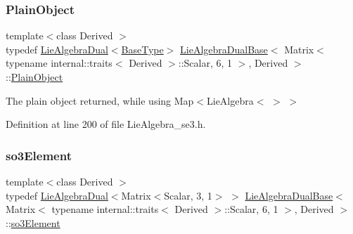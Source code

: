 \subsubsection{\texorpdfstring{Plain\+Object}{PlainObject}}
{\footnotesize\ttfamily template$<$class Derived $>$ \\
typedef \hyperlink{class_lie_algebra_dual}{Lie\+Algebra\+Dual}$<$\hyperlink{class_lie_algebra_dual_base_3_01_matrix_3_01typename_01internal_1_1traits_3_01_derived_01_4_1_1_7557dc73cbfcbc32e399b9855a977d47_a9593517bd5d02d1330f7940eb5865eda}{Base\+Type}$>$ \hyperlink{class_lie_algebra_dual_base}{Lie\+Algebra\+Dual\+Base}$<$ Matrix$<$ typename internal\+::traits$<$ Derived $>$\+::Scalar, 6, 1 $>$, Derived $>$\+::\hyperlink{class_lie_algebra_dual_base_3_01_matrix_3_01typename_01internal_1_1traits_3_01_derived_01_4_1_1_7557dc73cbfcbc32e399b9855a977d47_a34fb3c6349c2f83f38780d146799886c}{Plain\+Object}}

The plain object returned, while using Map$<$Lie\+Algebra$<$ $>$ $>$ 

Definition at line 200 of file Lie\+Algebra\+\_\+se3.\+h.

\hypertarget{class_lie_algebra_dual_base_3_01_matrix_3_01typename_01internal_1_1traits_3_01_derived_01_4_1_1_7557dc73cbfcbc32e399b9855a977d47_ab33be35099ff8bda572467ce899de5aa}{}\label{class_lie_algebra_dual_base_3_01_matrix_3_01typename_01internal_1_1traits_3_01_derived_01_4_1_1_7557dc73cbfcbc32e399b9855a977d47_ab33be35099ff8bda572467ce899de5aa} 
\subsubsection{\texorpdfstring{so3\+Element}{so3Element}}
{\footnotesize\ttfamily template$<$class Derived $>$ \\
typedef \hyperlink{class_lie_algebra_dual}{Lie\+Algebra\+Dual}$<$Matrix$<$Scalar, 3, 1$>$ $>$ \hyperlink{class_lie_algebra_dual_base}{Lie\+Algebra\+Dual\+Base}$<$ Matrix$<$ typename internal\+::traits$<$ Derived $>$\+::Scalar, 6, 1 $>$, Derived $>$\+::\hyperlink{class_lie_algebra_dual_base_3_01_matrix_3_01typename_01internal_1_1traits_3_01_derived_01_4_1_1_7557dc73cbfcbc32e399b9855a977d47_ab33be35099ff8bda572467ce899de5aa}{so3\+Element}}

